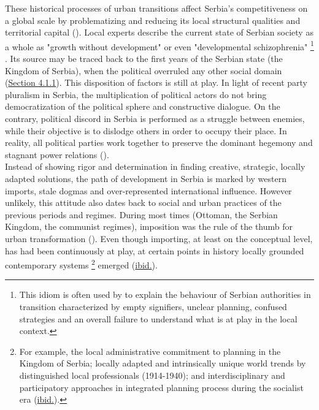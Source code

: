 \documentclass[11pt]{report}
\begin{document}
These historical processes of urban transitions affect Serbia’s competitiveness on a global scale by problematizing and reducing its local structural qualities and territorial capital (\href{Vujosevic}{\citealt{vujosevic_conundrum_2012}}). Local experts describe the current state of Serbian society as a whole as "growth without development" or even "developmental schizophrenia"
\footnote{This idiom is often used by \href{Vujosevic}{\citealt{vujosevic_postsocijalisticka_2010}} to explain the behaviour of Serbian authorities in transition characterized by empty signifiers, unclear planning, confused strategies and an overall failure to understand what is at play in the local context.} \href{ref}{\citealt{vujosevic_collapse_2010}}.
Its source may be traced back to the first years of the Serbian state (the Kingdom of Serbia), when the political overruled any other social domain (\href{Section 4.1.1}{Section 4.1.1}). This disposition of factors is still at play. In light of recent party pluralism in Serbia, the multiplication of political actors do not bring democratization of the political sphere and constructive dialogue.   On the contrary, political discord in Serbia is performed as a struggle between enemies, while their objective is to dislodge others in order to occupy their place. In reality, all political parties work together to preserve the dominant hegemony and stagnant power relations (\href{Mouffe}{\citealt{mouffe_which_2002}}).
\\

Instead of showing rigor and determination in finding creative, strategic, locally adapted solutions, the path of development in Serbia is marked by western imports, stale dogmas and over-represented international influence. However unlikely, this attitude also dates back to social and urban practices of the previous periods and regimes. During most times (Ottoman, the Serbian Kingdom, the communist regimes), imposition was the rule of the thumb for urban transformation (\href{Nedovic}{\citealt{nedovicbudic_waves_2006}}). Even though importing, at least on the conceptual level, has had been continuously at play, at certain points in history locally grounded contemporary systems
\footnote{For example, the local administrative commitment to planning in the Kingdom of Serbia; locally adapted and intrinsically unique world trends by distinguished local professionals (1914-1940); and interdisciplinary and participatory approaches in integrated planning process during the socialist era (\href{Nedovic}{ibid.}).}
emerged (\href{Nedovic}{ibid.}).
\\
\end{document}
